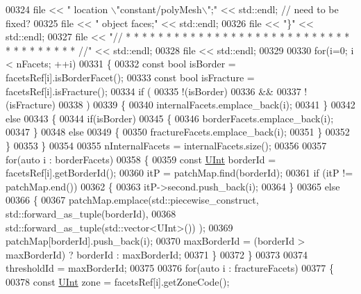 \begin{DoxyCode}
00324     file << \textcolor{stringliteral}{"    location    \(\backslash\)"constant/polyMesh\(\backslash\)";"} << std::endl; \textcolor{comment}{// need to be fixed?}
00325     file << \textcolor{stringliteral}{"    object      faces;"} << std::endl;
00326     file << \textcolor{stringliteral}{"\}"} << std::endl;
00327     file << \textcolor{stringliteral}{"// * * * * * * * * * * * * * * * * * * * * * * * * * * * * * * * * * * * * * //"} << std::endl;
00328     file << std::endl;
00329 
00330     \textcolor{keywordflow}{for}(i=0; i < nFacets; ++i)
00331     \{
00332         \textcolor{keyword}{const} \textcolor{keywordtype}{bool} isBorder = facetsRef[i].isBorderFacet();
00333         \textcolor{keyword}{const} \textcolor{keywordtype}{bool} isFracture = facetsRef[i].isFracture();
00334         \textcolor{keywordflow}{if} (
00335              !(isBorder)
00336                 &&
00337              !(isFracture)
00338            )
00339         \{
00340             internalFacets.emplace\_back(i);
00341         \}
00342         \textcolor{keywordflow}{else}
00343         \{
00344             \textcolor{keywordflow}{if}(isBorder)
00345             \{
00346                 borderFacets.emplace\_back(i);
00347             \}
00348             \textcolor{keywordflow}{else}
00349             \{
00350                 fractureFacets.emplace\_back(i);
00351             \}
00352         \}
00353     \}
00354 
00355     nInternalFacets = internalFacets.size();
00356 
00357     \textcolor{keywordflow}{for}(\textcolor{keyword}{auto} i : borderFacets)
00358     \{
00359         \textcolor{keyword}{const} \hyperlink{namespaceFVCode3D_a4bf7e328c75d0fd504050d040ebe9eda}{UInt} borderId = facetsRef[i].getBorderId();
00360         itP = patchMap.find(borderId);
00361         \textcolor{keywordflow}{if} (itP != patchMap.end())
00362         \{
00363             itP->second.push\_back(i);
00364         \}
00365         \textcolor{keywordflow}{else}
00366         \{
00367             patchMap.emplace(std::piecewise\_construct, std::forward\_as\_tuple(borderId),
00368                              std::forward\_as\_tuple(std::vector<UInt>()) );
00369             patchMap[borderId].push\_back(i);
00370             maxBorderId = (borderId > maxBorderId) ? borderId : maxBorderId;
00371         \}
00372     \}
00373 
00374     thresholdId = maxBorderId;
00375 
00376     \textcolor{keywordflow}{for}(\textcolor{keyword}{auto} i : fractureFacets)
00377     \{
00378         \textcolor{keyword}{const} \hyperlink{namespaceFVCode3D_a4bf7e328c75d0fd504050d040ebe9eda}{UInt} zone = facetsRef[i].getZoneCode();

\end{DoxyCode}

